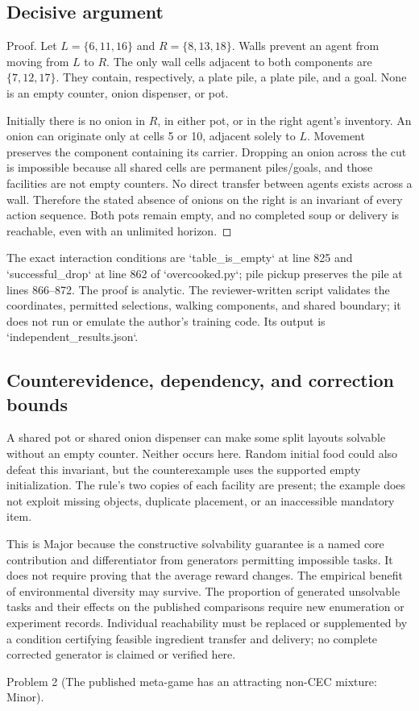 \documentclass[10pt]{article}
\begin{document}
\subsection*{Decisive argument}
Proof. Let \(L=\{6,11,16\}\) and \(R=\{8,13,18\}\). Walls prevent an agent from moving from \(L\) to \(R\). The only wall cells adjacent to both components are \(\{7,12,17\}\). They contain, respectively, a plate pile, a plate pile, and a goal. None is an empty counter, onion dispenser, or pot.\par
Initially there is no onion in \(R\), in either pot, or in the right agent’s inventory. An onion can originate only at cells 5 or 10, adjacent solely to \(L\). Movement preserves the component containing its carrier. Dropping an onion across the cut is impossible because all shared cells are permanent piles/goals, and those facilities are not empty counters. No direct transfer between agents exists across a wall. Therefore the stated absence of onions on the right is an invariant of every action sequence. Both pots remain empty, and no completed soup or delivery is reachable, even with an unlimited horizon. ◻\par
The exact interaction conditions are `table\_is\_empty` at line 825 and `successful\_drop` at line 862 of `overcooked.py`; pile pickup preserves the pile at lines 866–872. The proof is analytic. The reviewer-written script validates the coordinates, permitted selections, walking components, and shared boundary; it does not run or emulate the author’s training code. Its output is `independent\_results.json`.\par
\subsection*{Counterevidence, dependency, and correction bounds}
A shared pot or shared onion dispenser can make some split layouts solvable without an empty counter. Neither occurs here. Random initial food could also defeat this invariant, but the counterexample uses the supported empty initialization. The rule’s two copies of each facility are present; the example does not exploit missing objects, duplicate placement, or an inaccessible mandatory item.\par
This is Major because the constructive solvability guarantee is a named core contribution and differentiator from generators permitting impossible tasks. It does not require proving that the average reward changes. The empirical benefit of environmental diversity may survive. The proportion of generated unsolvable tasks and their effects on the published comparisons require new enumeration or experiment records. Individual reachability must be replaced or supplemented by a condition certifying feasible ingredient transfer and delivery; no complete corrected generator is claimed or verified here.\par
Problem 2 (The published meta-game has an attracting non-CEC mixture: Minor).\par
\end{document}
